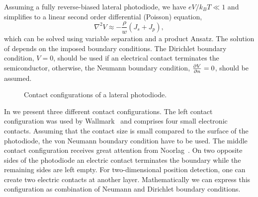 Assuming a fully reverse-biased lateral photodiode, we have $eV/k_BT\ll1$ and  simplifies to a linear second order differential (Poisson) equation,
\begin{equation}
	\nabla^2V\approx-\frac{\rho}{w}\left(J_s+J_p\right)
	\label{eq:lucovsky_reverse_bias},
\end{equation}
which can be solved using variable separation and a product Ansatz.
The solution of  depends on the imposed boundary conditions.
The Dirichlet boundary condition, $V=0$, should be used if an electrical contact terminates the semiconductor, otherwise, the Neumann boundary condition, $\pdv{V}{n}=0$, should be assumed.
\begin{figure}[H]
	\centering
	\caption{Contact configurations of a lateral photodiode.}\label{fig:lateral_photodiode_contacts}
\end{figure}
In  we present three different contact configurations.
The left contact configuration was used by Wallmark~\cite{Wallmark57} and comprises four small electronic contacts.
Assuming that the contact size is small compared to the surface of the photodiode, the von Neumann boundary condition have to be used.
The middle contact configuration receives great attention from Noorlag~\cite{Noorlag74}.
On two opposite sides of the photodiode an electric contact terminates the boundary while the remaining sides are left empty.
For two-dimensional position detection, one can create two electric contacts at another layer.
Mathematically we can express this configuration as combination of Neumann and Dirichlet boundary conditions.
